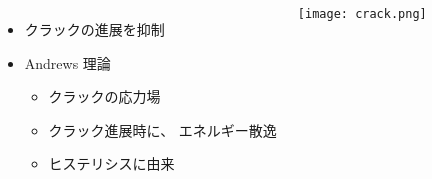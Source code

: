 \begin{columns}[totalwidth=.9\textwidth]
        \begin{itemize}
            \item クラックの進展を\alert{抑制}
            \item Andrews 理論\cite{andrews}
                \begin{itemize}
                    \item クラックの応力場
                    \item クラック進展時に、{\color{red} エネルギー散逸}
                    \item \alert{ヒステリシスに由来}
                \end{itemize}	
        \end{itemize}
        \texttt{[image: crack.png]}     
\end{columns}
